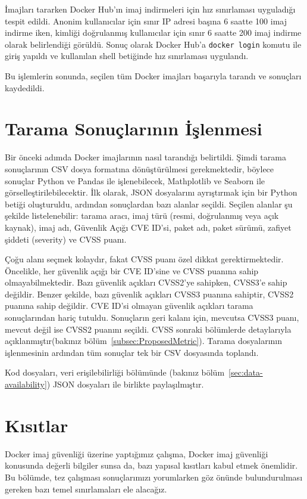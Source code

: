 İmajları tararken Docker Hub'ın imaj indirmeleri için hız sınırlaması uyguladığı tespit edildi. Anonim kullanıcılar için sınır IP adresi başına 6 saatte 100 imaj indirme iken, kimliği doğrulanmış kullanıcılar için sınır 6 saatte 200 imaj indirme olarak belirlendiği görüldü. Sonuç olarak Docker Hub'a \verb|docker login| komutu ile giriş yapıldı ve kullanılan shell betiğinde hız sınırlaması uygulandı.

Bu işlemlerin sonunda, seçilen tüm Docker imajları başarıyla tarandı ve sonuçları kaydedildi.

\section{Tarama Sonuçlarının İşlenmesi}\label{sec:DataProcessing}

Bir önceki adımda Docker imajlarının nasıl tarandığı belirtildi. Şimdi tarama sonuçlarının CSV dosya formatına dönüştürülmesi gerekmektedir, böylece sonuçlar Python ve Pandas ile işlenebilecek, Mathplotlib ve Seaborn ile görselleştirilebilecektir. İlk olarak, JSON dosyalarını ayrıştırmak için bir Python betiği oluşturuldu, ardından sonuçlardan bazı alanlar seçildi. Seçilen alanlar şu şekilde listelenebilir: tarama aracı, imaj türü (resmi, doğrulanmış veya açık kaynak), imaj adı, Güvenlik Açığı CVE ID'si, paket adı, paket sürümü, zafiyet şiddeti (severity) ve CVSS puanı.

Çoğu alanı seçmek kolaydır, fakat CVSS puanı özel dikkat gerektirmektedir. Öncelikle, her güvenlik açığı bir CVE ID'sine ve CVSS puanına sahip olmayabilmektedir. Bazı güvenlik açıkları CVSS2'ye sahipken, CVSS3'e sahip değildir. Benzer şekilde, bazı güvenlik açıkları CVSS3 puanına sahiptir, CVSS2 puanına sahip değildir. CVE ID'si olmayan güvenlik açıkları tarama sonuçlarından hariç tutuldu. Sonuçların geri kalanı için, mevcutsa CVSS3 puanı, mevcut değil ise CVSS2 puanını seçildi. CVSS sonraki bölümlerde detaylarıyla açıklanmıştır(bakınız bölüm~\ref{subsec:ProposedMetric}). Tarama dosyalarının işlenmesinin ardından tüm sonuçlar tek bir CSV dosyasında toplandı.

Kod dosyaları, veri erişilebilirliği bölümünde (bakınız bölüm~\ref{sec:data-availability}) JSON dosyaları ile birlikte paylaşılmıştır.

\section{Kısıtlar}\label{sec:limitations}

Docker imaj güvenliği üzerine yaptığımız çalışma, Docker imaj güvenliği konusunda değerli bilgiler sunsa da, bazı yapısal kısıtları kabul etmek önemlidir. Bu bölümde, tez çalışması sonuçlarımızı yorumlarken göz önünde bulundurulması gereken bazı temel sınırlamaları ele alacağız.

